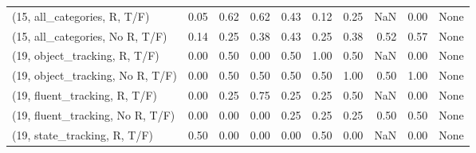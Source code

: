 \begin{table*}[h!]
\begin{adjustbox}{width=2\columnwidth,center}
\begin{tabular}{lrrr|rrr|rrr}
(15, all\_categories, R, T/F)          &                      0.05 &                  0.62 &                      0.62 &                          0.43 &                      0.12 &                          0.25 &                                    NaN &                               0.00 &                                  None \\
(15, all\_categories, No R, T/F)       &                      0.14 &                  0.25 &                      0.38 &                          0.43 &                      0.25 &                          0.38 &                                   0.52 &                               0.57 &                                  None \\



\midrule
(19, object\_tracking, R, T/F)         &                      0.00 &                  0.50 &                      0.00 &                          0.50 &                      1.00 &                          0.50 &                                    NaN &                               0.00 &                                  None \\
(19, object\_tracking, No R, T/F)      &                      0.00 &                  0.50 &                      0.50 &                          0.50 &                      0.50 &                          1.00 &                                   0.50 &                               1.00 &                                  None \\
(19, fluent\_tracking, R, T/F)         &                      0.00 &                  0.25 &                      0.75 &                          0.25 &                      0.25 &                          0.50 &                                    NaN &                               0.00 &                                  None \\
(19, fluent\_tracking, No R, T/F)      &                      0.00 &                  0.00 &                      0.00 &                          0.25 &                      0.25 &                          0.25 &                                   0.50 &                               0.50 &                                  None \\
(19, state\_tracking, R, T/F)          &                      0.50 &                  0.00 &                      0.00 &                          0.00 &                      0.50 &                          0.00 &                                    NaN &                               0.00 &                                  None \\

\end{tabular}
\end{adjustbox}
\end{table*}
